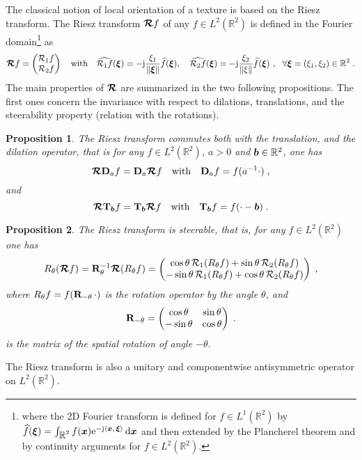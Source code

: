 \documentclass{elsarticle}
\newtheorem{proposition}{Proposition}
\def\R{\mbox{$\mathbb{R}$}}
\def\vx{\vect{x}}
\def\vxi{\vect{\xi}}
\begin{document}
The classical notion of local orientation of a texture is based on the Riesz transform. The Riesz transform $\bm{\mathcal{R}} f$ of any $f\in L^2(\mathbb{R}^2)$ is defined in the Fourier domain\footnote{where the 2D Fourier transform is defined for $f\in L^1 (\mathbb{R}^2)$ by $\widehat f(\vxi)=\int_{\R^2} f(\vx) \eu^{-\jj \ip{\vx}{\vxi}} \dif \vx$ and then extended by the Plancherel theorem and by continuity arguments for $f\in L^2 (\mathbb{R}^2)$.} as
\[
\RTb f=\begin{pmatrix}\RT_1f\\\RT_2f\end{pmatrix}\quad \text{with}\quad \widehat{\RT_1f}(\vect{\xi})=-\jj \frac{\xi_1}{\norme{\vect{\xi}}}\widehat{f}(\vect{\xi}),\quad \widehat{\mathcal{R}_2f}(\vect{\xi})=-\jj \frac{\xi_2}{\norme{\xi}}\widehat{f}(\vect{\xi})~,~~\forall  \vect{\xi} =(\xi_1, \xi_2) \in \R^2\;.
\]
The main properties of $\bm{\mathcal{R}}$ \cite{Stein70,UV09} are summarized in the two following propositions. The first ones concern the invariance with respect to dilations, translations, and the steerability property (relation with the rotations).
\begin{proposition}\label{pro:dil}
The Riesz transform commutes both with the translation, and the dilation operator, that is for any $f\in L^2(\mathbb{R}^2)$, $a>0$ and $\bm{b}\in \mathbb{R}^2$, one has
\[
\bm{\mathcal{R}} \mathbf{D}_a f=\mathbf{D}_a\bm{\mathcal{R}} f\quad \text{with}\quad \mathbf{D}_a f=f(a^{-1} \cdot)\;,
\]
and\
\[
\bm{\mathcal{R}} \mathbf{T}_{\bm{b}} f=\mathbf{T}_{\bm{b}}\bm{\mathcal{R}} f\quad \text{with}\quad \mathbf{T}_{\bm{b}} f=f(\cdot-\bm{b})\;.
\]
\end{proposition}
%
\begin{proposition}\label{pro:steer}
The Riesz transform is steerable, that is, for any $f\in L^2(\mathbb{R}^2)$ one has
\[
{R}_\theta(\bm{\mathcal{R}} f)=\mathbf{R}_\theta^{-1}\bm{\mathcal{R}} ({R}_\theta f)=\begin{pmatrix}\cos\theta\, \mathcal{R}_1({R}_\theta f)+\sin\theta\, \mathcal{R}_2({R}_\theta f)\\-\sin\theta\, \mathcal{R}_1({R}_\theta f)+\cos\theta\, \mathcal{R}_2({R}_\theta f)\end{pmatrix}\;,
\] 
where ${R}_\theta f=f(\mathbf{R}_{-\theta}\, \cdot)$ is the rotation operator by the angle $\theta$, and 
\[
\mathbf{R}_{-\theta}=\begin{pmatrix}\cos\theta&\sin\theta\\ -\sin\theta&\cos\theta\end{pmatrix}\;.
\]
is the matrix of the spatial rotation of angle $-\theta$.
\end{proposition}
The Riesz transform is also a unitary and componentwise antisymmetric operator on $L^2(\mathbb{R}^2)$.
\end{document}
